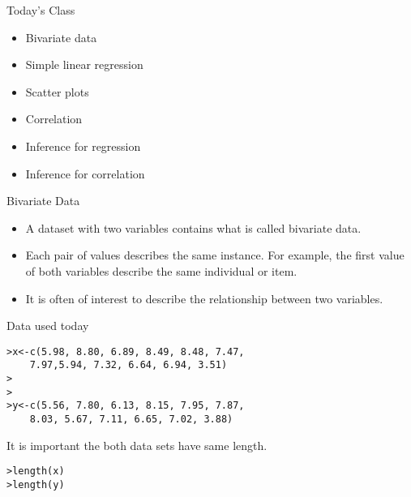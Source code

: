 \documentclass[pdf,default,slideColor,colorBG]{prosper}
\begin{document}
\begin{slide}{Today's Class}

\begin{itemize}
\item Bivariate data
\item Simple linear regression
\item Scatter plots
\item Correlation
\item Inference for regression
\item Inference for correlation

\end{itemize}

\end{slide}



\begin{slide}{Bivariate Data}

\begin{itemize}
\item A dataset with two variables contains what is called bivariate data.

\item Each pair of values describes the same instance. For example, the first value of both variables describe the same individual or item.
    
\item It is often of interest to describe the relationship between two variables.
\end{itemize}
\end{slide}

\begin{slide}{Data used today}

\begin{verbatim}
>x<-c(5.98, 8.80, 6.89, 8.49, 8.48, 7.47,
    7.97,5.94, 7.32, 6.64, 6.94, 3.51)
>
>
>y<-c(5.56, 7.80, 6.13, 8.15, 7.95, 7.87,
    8.03, 5.67, 7.11, 6.65, 7.02, 3.88)

\end{verbatim}
It is important the both data sets have same length.
\begin{verbatim}
>length(x)
>length(y)

\end{verbatim}
\end{slide}
\end{document}
